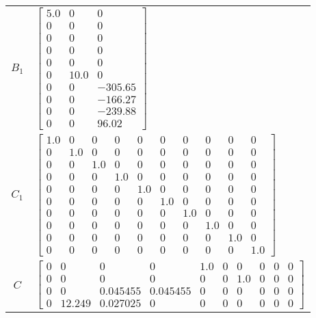 \begin{tabular}{cl}
 $B_{1}$  & $\left[\begin{matrix}5.0 & 0 & 0\\0 & 0 & 0\\0 & 0 & 0\\0 & 0 & 0\\0 & 0 & 0\\0 & 10.0 & 0\\0 & 0 & -305.65\\0 & 0 & -166.27\\0 & 0 & -239.88\\0 & 0 & 96.02\end{matrix}\right]$                                                                                                                                                                                                                                                                                                                                                                                                                                                                                                   \\
 $C_{1}$  & $\left[\begin{matrix}1.0 & 0 & 0 & 0 & 0 & 0 & 0 & 0 & 0 & 0\\0 & 1.0 & 0 & 0 & 0 & 0 & 0 & 0 & 0 & 0\\0 & 0 & 1.0 & 0 & 0 & 0 & 0 & 0 & 0 & 0\\0 & 0 & 0 & 1.0 & 0 & 0 & 0 & 0 & 0 & 0\\0 & 0 & 0 & 0 & 1.0 & 0 & 0 & 0 & 0 & 0\\0 & 0 & 0 & 0 & 0 & 1.0 & 0 & 0 & 0 & 0\\0 & 0 & 0 & 0 & 0 & 0 & 1.0 & 0 & 0 & 0\\0 & 0 & 0 & 0 & 0 & 0 & 0 & 1.0 & 0 & 0\\0 & 0 & 0 & 0 & 0 & 0 & 0 & 0 & 1.0 & 0\\0 & 0 & 0 & 0 & 0 & 0 & 0 & 0 & 0 & 1.0\end{matrix}\right]$                                                                                                                                                                                                                  \\
   $C$    & $\left[\begin{matrix}0 & 0 & 0 & 0 & 1.0 & 0 & 0 & 0 & 0 & 0\\0 & 0 & 0 & 0 & 0 & 0 & 1.0 & 0 & 0 & 0\\0 & 0 & 0.045455 & 0.045455 & 0 & 0 & 0 & 0 & 0 & 0\\0 & 12.249 & 0.027025 & 0 & 0 & 0 & 0 & 0 & 0 & 0\end{matrix}\right]$                                                                                                                                                                                                                                                                                                                                                                                                                                                  \\

\end{tabular}
